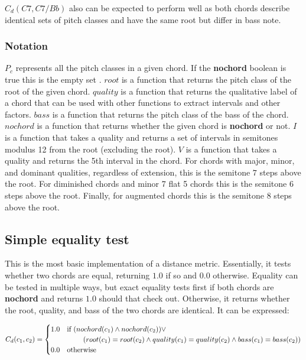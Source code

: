 $C_d(C7, C7/Bb)$ also can be expected to perform well as both chords describe identical sets of pitch classes and have the same root but differ in bass note.

\subsubsection{Notation}

$P_c$ represents all the pitch classes in a given chord. If the \textbf{nochord} boolean is true this is the empty set ${}$.
$root$ is a function that returns the pitch class of the root of the given chord.
$quality$ is a function that returns the qualitative label of a chord that can be used with other functions to extract intervals and other factors.
$bass$ is a function that returns the pitch class of the bass of the chord.
$nochord$ is a function that returns whether the given chord is \textbf{nochord} or not.
$I$ is a function that takes a quality and returns a set of intervals in semitones modulus 12 from the root (excluding the root).
$V$ is a function that takes a quality and returns the 5th interval in the chord. For chords with major, minor, and dominant qualities, regardless of extension, this is the semitone $7$ steps above the root. For diminished chords and minor 7 flat 5 chords this is the semitone $6$ steps above the root. Finally, for augmented chords this is the semitone $8$ steps above the root.

\subsection{Simple equality test}

This is the most basic implementation of a distance metric. Essentially, it tests whether two chords are equal, returning $1.0$ if so and $0.0$ otherwise. Equality can be tested in multiple ways, but exact equality tests first if both chords are \textbf{nochord} and returns $1.0$ should that check out. Otherwise, it returns whether the root, quality, and bass of the two chords are identical. It can be expressed:

\[ C_d(c_1,c_2) = \begin{cases} 1.0 & \text{if }(nochord(c_1) \land nochord(c_2)) \lor \\ & \hspace{0.8cm}(root(c_1) = root(c_2) \land quality(c_1) = quality(c_2) \land bass(c_1) = bass(c_2)) \\ 0.0 & \text{otherwise} \end{cases} \]

